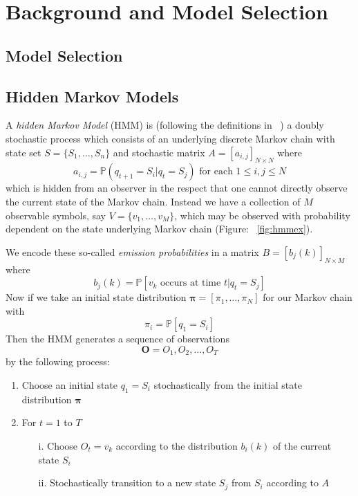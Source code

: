 
\chapter{Background and Model Selection}
\ifpdf
    \graphicspath{{Chapter1/Chapter1Figs/PNG/}{Chapter1/Chapter1Figs/PDF/}{Chapter1/Chapter1Figs/}}
\else
    \graphicspath{{Chapter1/Chapter1Figs/EPS/}{Chapter1/Chapter1Figs/}}
\fi

\section{Model Selection}

\section{Hidden Markov Models}
A \emph{hidden Markov Model} (HMM) is (following the definitions in ~\cite{rabiner1989tutorial}) a doubly stochastic process which consists of an underlying discrete Markov chain with state set $S = \{S_1, \dots, S_n \}$ and stochastic matrix $A=[a_{i,j}]_{N\times N}$ where 
\begin{equation*}
a_{i,j} = \mathbb{P}(q_{t+1} = S_i | q_t = S_j) \text{  for each  } 1 \leq i,j \leq N
\end{equation*}
which is hidden from an observer in the respect that one cannot directly observe the current state of the Markov chain. Instead we have a collection of $M$ observable symbols, say $V = \{ v_1, \dots, v_M\}$, which may be observed with probability dependent on the state underlying Markov chain (Figure:  ~\ref{fig:hmmex}). 

We encode these so-called \emph{emission probabilities} in a matrix $B = [b_j(k)]_{N\times M}$ where
\begin{equation*}
b_j(k) = \mathbb{P}[v_k \text{ occurs at time }t | q_t = S_j] 
\end{equation*}
Now if we take an initial state distribution $\bm{\pi} = [\pi_1, \dots, \pi_N]$ for our Markov chain with
\begin{equation*}
\pi_i= \mathbb{P}[q_1 = S_i]
\end{equation*}
Then the HMM generates a sequence of observations
\begin{equation*}
\bm{O} = O_1, O_2, \ldots , O_T
\end{equation*}
by the following process:
\begin{enumerate}
\item Choose an initial state $q_1 = S_i$ stochastically from the initial state distribution $\bm{\pi}$
\item For $t=1$ to $T$
\begin{enumerate}
\item[i.] Choose $O_t = v_k$ according to the distribution $b_i(k)$ of the current state $S_i$
\item[ii.] Stochastically transition to a new state $S_j$ from $S_i$ according to $A$ 
\end{enumerate}
\end{enumerate}

